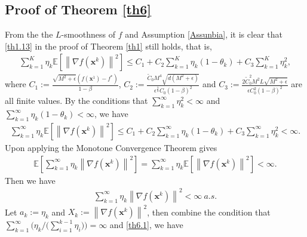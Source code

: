 \documentclass[twoside,11pt]{article}
\begin{document}
\subsection{Proof of Theorem \ref{th6}}\label{Proof of th6}

From the the $L$-smoothness of $f$ and Assumption \ref{Assunbia}, it is clear that \eqref{th1.13} in the proof of Theorem \ref{th1} still holds, that is,
\begin{equation}
   	\begin{aligned}
   	\sum_{k=1}^{K}\eta_k\mathbb{E}\left[\left\| \nabla f(\mathbf{x}^k)\right\|^2\right]
   	\le C_1
   	+C_2\sum_{k=1}^{K}\eta_k(1-\theta_k)+C_3 \sum_{k=1}^{K}\eta_{k}^2
   	,\nonumber
   	\end{aligned}
\end{equation}
where $C_1:=\frac{\sqrt{M^2+\epsilon}\left( f(\mathbf{x}^1)-f^*\right) }{1-\beta}$, $C_2:=\frac{\tilde{C}_0 M^4\sqrt{d(M^2+\epsilon)}}{\epsilon^{\frac{3}{2}}C_0(1-\beta)^2}$ and $C_3:=\frac{2\tilde{C}_0^2 M^2L\sqrt{M^2+\epsilon}}{\epsilon C_0^2(1-\beta)^2}$ are all finite values.
By the conditions that $\sum_{k=1}^{\infty}\eta_{k}^2<\infty$ and $\sum_{k=1}^{\infty}\eta_{k}(1-\theta_k)<\infty$, we have
\begin{equation}\label{th2.2}
   	\begin{aligned}
   	\sum_{k=1}^{\infty}\eta_k\mathbb{E}\left[\left\| \nabla f(\mathbf{x}^k)\right\|^2\right]
   	\le C_1
   	+C_2\sum_{k=1}^{\infty}\eta_k(1-\theta_k)+C_3 \sum_{k=1}^{\infty}\eta_{k}^2
   	<\infty.\nonumber
   	\end{aligned}
\end{equation}
Upon applying the Monotone Convergence Theorem \citep[see][chap.~2 Theorem 14]{galambos1995advanced} gives
\begin{equation}
   	\begin{aligned}
   	\mathbb{E}\left[\sum_{k=1}^{\infty}\eta_k\left\| \nabla f(\mathbf{x}^k)\right\|^2\right]
   	=\sum_{k=1}^{\infty}\eta_k\mathbb{E}\left[\left\| \nabla f(\mathbf{x}^k)\right\|^2\right]
   	<\infty.\nonumber
   	\end{aligned}
\end{equation}
Then we have
\begin{equation}\label{th6.1}
   	\begin{aligned}
   	\sum_{k=1}^{\infty}\eta_k\left\| \nabla f(\mathbf{x}^k)\right\|^2<\infty\ a.s.
   	\end{aligned}
\end{equation}
Let $a_k:=\eta_{k}$ and $X_k:=\left\| \nabla f(\mathbf{x}^k)\right\|^2$, then combine the condition that $\sum_{k=1}^{\infty}\big( {\eta_k}/\big( {\sum_{i=1}^{k-1}\eta_i}\big)\big) =\infty$ and \eqref{th6.1}, we have
\end{document}
